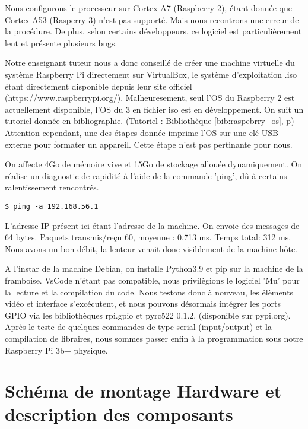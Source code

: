 \documentclass[a4paper]{report}
\begin{document}
    Nous configurons le processeur sur Cortex-A7 (Raspberry 2), étant donnée que Cortex-A53
    (Rasperry 3) n'est pas supporté. Mais nous recontrons une erreur de la procédure. De plus,
    selon certains développeurs, ce logiciel est particulièrement lent et présente plusieurs bugs.

    Notre enseignant tuteur nous a donc conseillé de créer une machine virtuelle du système
    Raspberry Pi directement sur VirtualBox, le système d'exploitation .iso étant directement
    disponible depuis leur site officiel (https://www.raspberrypi.org/). Malheuresement, seul 
    l'OS du Raspberry 2 est actuellement disponible, l'OS du 3 en fichier iso est en développement. 
    On suit un tutoriel donnée en bibliographie.  (Tutoriel : Bibliothèque \ref{bib:raspebrry_os},
    p\pageref{bib:raspebrry_os}) Attention cependant, une des étapes donnée imprime l'OS sur une 
    clé USB externe pour formater un appareil. Cette étape n'est pas pertinante pour nous.

    On affecte 4Go de mémoire vive et 15Go de stockage allouée dynamiquement. On réalise un
    diagnostic de rapidité à l'aide de la commande 'ping', dû à certains ralentissement rencontrés. 
    \begin{verbatim}$ ping -a 192.168.56.1 \end{verbatim}
    L'adresse IP présent ici étant l'adresse de la machine. On envoie des messages de 64 bytes. 
    Paquets transmis/reçu 60, moyenne : 0.713 ms. Temps total: 312 ms. Nous avons un bon débit,
    la lenteur venait donc visiblement de la machine h\^{o}te.

    A l'instar de la machine Debian, on installe Python3.9 et pip sur la machine de la framboise.
    VsCode n'étant pas compatible, nous privilègions le logiciel 'Mu' pour la lecture et la 
    compilation du code. Nous testons donc à nouveau, les élèments vidéo et interface s'excécutent,
    et nous pouvons désormais intégrer les ports GPIO via les bibliothèques rpi.gpio
    et pyrc522 0.1.2. (disponible sur pypi.org).
    Après le teste de quelques commandes de type serial (input/output) et la compilation de libraires,
    nous sommes passer enfin à la programmation sous notre Raspberry Pi 3b+ physique.
        
        \section{Schéma de montage Hardware et description des composants}  \label{sec:schema montage}
\end{document}
